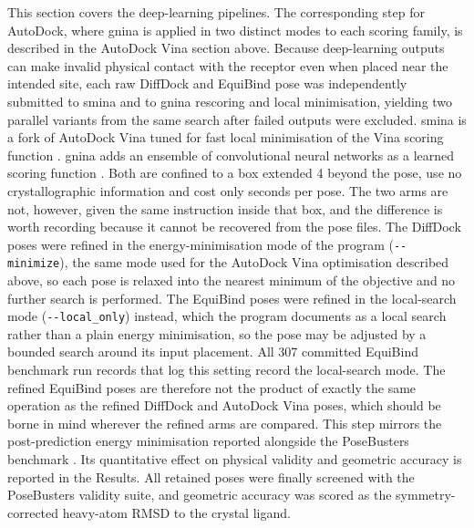 This section covers the deep-learning pipelines. The corresponding step for AutoDock, where gnina is applied in two distinct modes to each scoring family, is described in the AutoDock Vina section above. Because deep-learning outputs can make invalid physical contact with the receptor even when placed near the intended site, each raw DiffDock and EquiBind pose was independently submitted to smina and to gnina rescoring and local minimisation, yielding two parallel variants from the same search after failed outputs were excluded. smina is a fork of AutoDock Vina tuned for fast local minimisation of the Vina scoring function \cite{ref055}. gnina adds an ensemble of convolutional neural networks as a learned scoring function \cite{ref056}. Both are confined to a box extended 4\angstrom{} beyond the pose, use no crystallographic information and cost only seconds per pose. The two arms are not, however, given the same instruction inside that box, and the difference is worth recording because it cannot be recovered from the pose files. The DiffDock poses were refined in the energy-minimisation mode of the program (\texttt{-{}-minimize}), the same mode used for the AutoDock Vina optimisation described above, so each pose is relaxed into the nearest minimum of the objective and no further search is performed. The EquiBind poses were refined in the local-search mode (\texttt{-{}-local\_only}) instead, which the program documents as a local search rather than a plain energy minimisation, so the pose may be adjusted by a bounded search around its input placement. All 307 committed EquiBind benchmark run records that log this setting record the local-search mode. The refined EquiBind poses are therefore not the product of exactly the same operation as the refined DiffDock and AutoDock Vina poses, which should be borne in mind wherever the refined arms are compared. This step mirrors the post-prediction energy minimisation reported alongside the PoseBusters benchmark \cite{ref035}. Its quantitative effect on physical validity and geometric accuracy is reported in the Results. All retained poses were finally screened with the PoseBusters validity suite, and geometric accuracy was scored as the symmetry-corrected heavy-atom RMSD to the crystal ligand.

